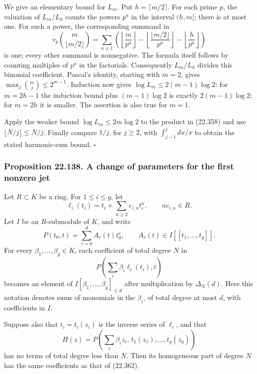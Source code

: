 \documentclass[
  11pt,
  a4paper,
]{article}
\begin{document}
We give an elementary bound for \(L_m\). Put \(h=\lceil m/2\rceil\). For
each prime \(p\), the valuation of \(L_m/L_h\) counts the powers \(p^a\)
in the interval \((h,m]\); there is at most one. For such a power, the
corresponding summand in \[
 v_p\binom m{\lfloor m/2\rfloor}
 =\sum_{a\ge1}
 \left(\left\lfloor\frac m{p^a}\right\rfloor
 -\left\lfloor\frac{\lfloor m/2\rfloor}{p^a}\right\rfloor
 -\left\lfloor\frac h{p^a}\right\rfloor\right)
 \tag{22.359}
\] is one; every other summand is nonnegative. The formula itself
follows by counting multiples of \(p^a\) in the factorials. Consequently
\(L_m/L_h\) divides this binomial coefficient. Pascal's identity,
starting with \(m=2\), gives \(\max_j\binom mj\le2^{m-1}\). Induction
now gives \(\log L_m\le2(m-1)\log2\): for \(m=2h-1\) the induction bound
plus \((m-1)\log2\) is exactly \(2(m-1)\log2\); for \(m=2h\) it is
smaller. The assertion is also true for \(m=1\).

Apply the weaker bound \(\log L_m\le2m\log2\) to the product in (22.358)
and use \(\lfloor N/j\rfloor\le N/j\). Finally compare \(1/j\), for
\(j\ge2\), with \(\int_{j-1}^j dx/x\) to obtain the stated harmonic-sum
bound. \(\square\)

\subsubsection{Proposition 22.138. A change of parameters for the first
nonzero
jet}\label{proposition-22.138.-a-change-of-parameters-for-the-first-nonzero-jet}

Let \(R\subset K\) be a ring. For \(1\le i\le g\), let \[
 \ell_i(t_i)=t_i+\sum_{n\ge2}c_{i,n}t_i^n,
 \qquad nc_{i,n}\in R.
 \tag{22.360}
\] Let \(I\) be an \(R\)-submodule of \(K\), and write \[
 P(t_0,t)=\sum_{r=0}^d A_r(t)t_0^r,\qquad
 A_r(t)\in I[[t_1,\ldots,t_g]].
 \tag{22.361}
\] For every \(\beta_1,\ldots,\beta_g\in K\), each coefficient of total
degree \(N\) in \[
 P\left(\sum_i\beta_i\ell_i(t_i),t\right)
 \tag{22.362}
\] becomes an element of \(I[\beta_1,\ldots,\beta_g]_{\le d}\) after
multiplication by \(\Delta_N(d)\). Here this notation denotes sums of
monomials in the \(\beta_i\), of total degree at most \(d\), with
coefficients in \(I\).

Suppose also that \(t_i=t_i(z_i)\) is the inverse series of \(\ell_i\),
and that \[
 H(z)=P\left(\sum_i\beta_i z_i,\,
                   t_1(z_1),\ldots,t_g(z_g)\right)
 \tag{22.363}
\] has no terms of total degree less than \(N\). Then its homogeneous
part of degree \(N\) has the same coefficients as that of (22.362).
\end{document}
